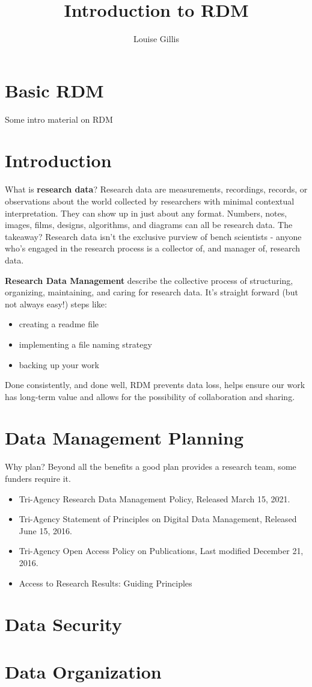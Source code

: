 \documentclass[
  openany]{book}
\title{Introduction to RDM}
\author{Louise Gillis}
\date{}
\providecommand{\tightlist}{%
  \setlength{\itemsep}{0pt}\setlength{\parskip}{0pt}}
\begin{document}
\maketitle

{
\setcounter{tocdepth}{1}
\tableofcontents
}
\chapter{Basic RDM}\label{basic-rdm}

Some intro material on RDM

\chapter{Introduction}\label{introduction}

What is \textbf{research data}? Research data are measurements, recordings, records, or observations about the world collected by researchers with minimal contextual interpretation. They can show up in just about any format. Numbers, notes, images, films, designs, algorithms, and diagrams can all be research data. The takeaway? Research data isn't the exclusive purview of bench scientists - anyone who's engaged in the research process is a collector of, and manager of, research data.

\textbf{Research Data Management} describe the collective process of structuring, organizing, maintaining, and caring for research data. It's straight forward (but not always easy!) steps like:

\begin{itemize}
\tightlist
\item
  creating a readme file
\item
  implementing a file naming strategy
\item
  backing up your work
\end{itemize}

Done consistently, and done well, RDM prevents data loss, helps ensure our work has long-term value and allows for the possibility of collaboration and sharing.

\chapter{Data Management Planning}\label{data-management-planning}

Why plan? Beyond all the benefits a good plan provides a research team, some funders require it.

\begin{itemize}
\tightlist
\item
  Tri-Agency Research Data Management Policy, Released March 15, 2021.
\item
  Tri-Agency Statement of Principles on Digital Data Management, Released June 15, 2016.
\item
  Tri-Agency Open Access Policy on Publications, Last modified December 21, 2016.
\item
  Access to Research Results: Guiding Principles
\end{itemize}

\chapter{Data Security}\label{data-security}

\chapter{Data Organization}\label{data-organization}
\end{document}
